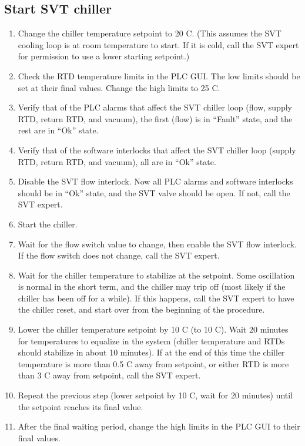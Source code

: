 \subsection{Start SVT chiller}
\begin{enumerate}
    \item Change the chiller temperature setpoint to 20 C. (This assumes the SVT cooling loop is at room temperature to start. If it is cold, call the SVT expert for permission to use a lower starting setpoint.)
    \item Check the RTD temperature limits in the PLC GUI. The low limits should be set at their final values. Change the high limits to 25 C.
    \item Verify that of the PLC alarms that affect the SVT chiller loop (flow, supply RTD, return RTD, and vacuum), the first (flow) is in ``Fault'' state, and the rest are in ``Ok'' state.
    \item Verify that of the software interlocks that affect the SVT chiller loop (supply RTD, return RTD, and vacuum), all are in ``Ok'' state.
    \item Disable the SVT flow interlock.
        Now all PLC alarms and software interlocks should be in ``Ok'' state, and the SVT valve should be open.
        If not, call the SVT expert.
    \item Start the chiller.
    \item Wait for the flow switch value to change, then enable the SVT flow interlock.
        If the flow switch does not change, call the SVT expert.
    \item Wait for the chiller temperature to stabilize at the setpoint.
        Some oscillation is normal in the short term, and the chiller may trip off (most likely if the chiller has been off for a while).
        If this happens, call the SVT expert to have the chiller reset, and start over from the beginning of the procedure.
    \item Lower the chiller temperature setpoint by 10 C (to 10 C).
        Wait 20 minutes for temperatures to equalize in the system (chiller temperature and RTDs should stabilize in about 10 minutes). If at the end of this time the chiller temperature is more than 0.5 C away from setpoint, or either RTD is more than 3 C away from setpoint, call the SVT expert.
    \item Repeat the previous step (lower setpoint by 10 C, wait for 20 minutes)  until the setpoint reaches its final value.
    \item After the final waiting period, change the high limits in the PLC GUI to their final values.
\end{enumerate}

